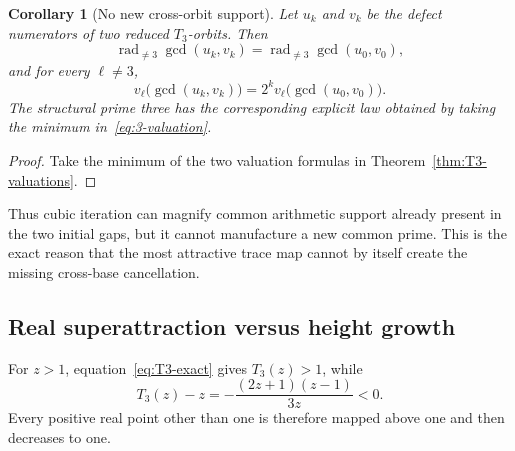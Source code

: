 \documentclass[11pt,oneside]{article}
\newtheorem{corollary}[theorem]{Corollary}
\theoremstyle{definition}
\theoremstyle{remark}
\newcommand{\rad}{\operatorname{rad}}
\begin{document}
\begin{corollary}[No new cross-orbit support]
\label{cor:no-new-support}
Let \(u_k\) and \(v_k\) be the defect numerators of two reduced \(T_3\)-orbits.  Then
\begin{equation}
 \rad_{\ne3}\gcd(u_k,v_k)
 =\rad_{\ne3}\gcd(u_0,v_0),
 \label{eq:radical-invariance}
\end{equation}
and for every \(\ell\ne3\),
\begin{equation}
 v_\ell\bigl(\gcd(u_k,v_k)\bigr)
 =2^k v_\ell\bigl(\gcd(u_0,v_0)\bigr).
 \label{eq:gcd-valuation-doubling}
\end{equation}
The structural prime three has the corresponding explicit law obtained by taking the minimum
in~\eqref{eq:3-valuation}.
\end{corollary}

\begin{proof}
Take the minimum of the two valuation formulas in
Theorem~\ref{thm:T3-valuations}.
\end{proof}

Thus cubic iteration can magnify common arithmetic support already present in the two initial
gaps, but it cannot manufacture a new common prime.  This is the exact reason that the most
attractive trace map cannot by itself create the missing cross-base cancellation.

\subsection{Real superattraction versus height growth}

For \(z>1\), equation~\eqref{eq:T3-exact} gives \(T_3(z)>1\), while
\begin{equation}
 T_3(z)-z=-\frac{(2z+1)(z-1)}{3z}<0.
 \label{eq:T3-monotone}
\end{equation}
Every positive real point other than one is therefore mapped above one and then decreases to
one.
\end{document}
